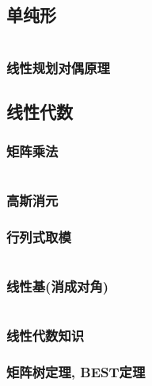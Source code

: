 \documentclass[a4paper, twoside]{article}
\begin{document}
\begin{multicols}{2}
			\subsection{单纯形}
				\inputminted{cpp}{../src/math/单纯形.cpp}

				\subsubsection{线性规划对偶原理}
					

			\subsection{线性代数}
				\subsubsection{矩阵乘法}
					\inputminted{cpp}{../src/math/矩阵乘法.cpp}

				\subsubsection{高斯消元}
					

				\subsubsection{行列式取模}
					\inputminted{cpp}{../src/math/行列式取模.cpp}



				\subsubsection{线性基(消成对角)}
					\inputminted{cpp}{../src/math/线性基.cpp}

				\subsubsection{线性代数知识}
					
				
				\subsubsection{矩阵树定理, BEST定理}
					
			

\end{multicols}
\end{document}
